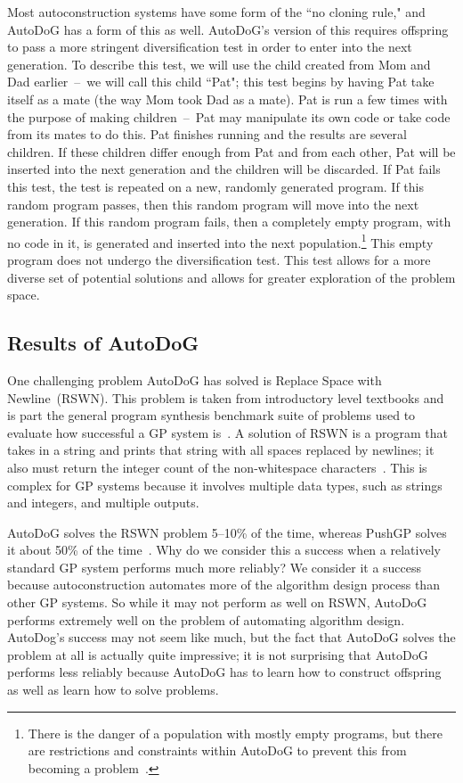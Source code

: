 \documentclass{sig-alternate}
\begin{document}
Most autoconstruction systems have some form of the ``no cloning rule," and AutoDoG has a form of this as well. AutoDoG's version of this requires offspring to pass a more stringent diversification test in order to enter into the next generation. To describe this test, we will use the child created from Mom and Dad earlier~--~we will call this child ``Pat"; this test begins by having Pat take itself as a mate (the way Mom took Dad as a mate). Pat is run a few times with the purpose of making children~--~Pat may manipulate its own code or take code from its mates to do this. Pat finishes running and the results are several children. If these children differ enough from Pat and from each other, Pat will be inserted into the next generation and the children will be discarded. If Pat fails this test, the test is repeated on a new, randomly generated program. If this random program passes, then this random program will move into the next generation. If this random program fails, then a completely empty program, with no code in it, is generated and inserted into the next population.\footnote{There is the danger of a population with mostly empty programs, but there are restrictions and constraints within AutoDoG to prevent this from becoming a problem~\cite{spector:2016}.} This empty program does not undergo the diversification test.
This test allows for a more diverse set of potential solutions and allows for greater exploration of the problem space.~\cite{spector:2016}

\subsection{Results of AutoDoG}
\label{sec:results}
One challenging problem AutoDoG has solved is Replace Space with Newline~(RSWN). This problem is taken from introductory level textbooks and is part the general program synthesis benchmark suite of problems used to evaluate how successful a GP system is~\cite{helmuth:2015}. A solution of RSWN is a program that takes in a string and prints that string with all spaces replaced by newlines; it also must return the integer count of the non-whitespace characters~\cite{helmuth:2015}. This is complex for GP systems because it involves multiple data types, such as strings and integers, and multiple outputs.

AutoDoG solves the RSWN problem 5--10\% of the time, whereas PushGP solves it about 50\% of the time~\cite{helmuth:2015}. Why do we consider this a success when a relatively standard GP system performs much more reliably? We consider it a success because autoconstruction automates more of the algorithm design process than other GP systems. So while it may not perform as well on RSWN, AutoDoG performs extremely well on the problem of automating algorithm design. AutoDog's success may not seem like much, but the fact that AutoDoG solves the problem at all is actually quite impressive; it is not surprising that AutoDoG performs less reliably because AutoDoG has to learn how to construct offspring as well as learn how to solve problems.
\end{document}
